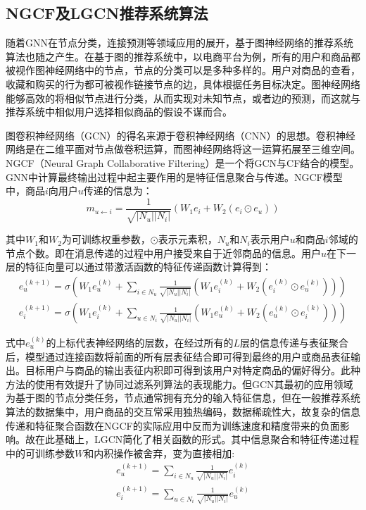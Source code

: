 \documentclass[lang=cn,11pt,a4paper,cite=authoryear]{elegantpaper}
\begin{document}
\subsection{NGCF及LGCN推荐系统算法}
随着GNN在节点分类，连接预测等领域应用的展开，基于图神经网络的推荐系统算法也随之产生。在基于图的推荐系统中，以电商平台为例，所有的用户和商品都被视作图神经网络中的节点，节点的分类可以是多种多样的。用户对商品的查看，收藏和购买的行为都可被视作链接节点的边，具体根据任务目标决定。图神经网络能够高效的将相似节点进行分类，从而实现对未知节点，或者边的预测，而这就与推荐系统中相似用户选择相似商品的假设不谋而合。

图卷积神经网络（GCN）的得名来源于卷积神经网络（CNN）的思想。卷积神经网络是在二维平面对节点做卷积运算，而图神经网络将这一运算拓展至三维空间。NGCF（Neural Graph Collaborative Filtering）是一个将GCN与CF结合的模型。GNN中计算最终输出过程中起主要作用的是特征信息聚合与传递。NGCF模型中，商品$i$向用户$u$传递的信息为：
\begin{equation}
  m_{u \leftarrow i} = \frac{1}{\sqrt{|N_u||N_i|}}(W_1e_i+W_2(e_i \odot e_u))
\end{equation}

其中$W_1$和$W_2$为可训练权重参数，$\odot$表示元素积，$N_u$和$N_i$表示用户$u$和商品$i$邻域的节点个数。即在消息传递的过程中用户接受来自于近邻商品的信息。用户$u$在下一层的特征向量可以通过带激活函数的特征传递函数计算得到：
\begin{gather}
  e_u^{(k+1)} = \sigma(W_1e_u^{(k)}+\sum_{i\in N_u}\frac{1}{\sqrt{|N_u||N_i|}}(W_1e_i^{(k)}+W_2(e_i^{(k)}\odot e_u^{(k)}))) \\
  e_i^{(k+1)} = \sigma(W_1e_i^{(k)}+\sum_{u\in N_i}\frac{1}{\sqrt{|N_u||N_i|}}(W_1e_u^{(k)}+W_2(e_u^{(k)}\odot e_i^{(k)})))
\end{gather}

式中$e_u^{(k)}$的上标代表神经网络的层数，在经过所有的$L$层的信息传递与表征聚合后，模型通过连接函数将前面的所有层表征结合即可得到最终的用户或商品表征输出。目标用户与商品的输出表征内积即可得到该用户对特定商品的偏好得分。此种方法的使用有效提升了协同过滤系列算法的表现能力。但GCN其最初的应用领域为基于图的节点分类任务，节点通常拥有充分的输入特征信息，但在一般推荐系统算法的数据集中，用户商品的交互常采用独热编码，数据稀疏性大，故复杂的信息传递和特征聚合函数在NGCF的实际应用中反而为训练速度和精度带来的负面影响。故在此基础上，LGCN简化了相关函数的形式。其中信息聚合和特征传递过程中的可训练参数$W$和内积操作被舍弃，变为直接相加:
\begin{gather}
  e_u^{(k+1)} = \sum_{i\in N_u}\frac{1}{\sqrt{|N_u||N_i|}}e_i^{(k)} \\
  e_i^{(k+1)} = \sum_{u\in N_i}\frac{1}{\sqrt{|N_u||N_i|}}e_u^{(k)}
\end{gather}
\end{document}
